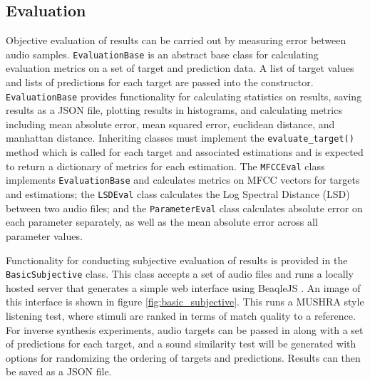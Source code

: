 \subsection{Evaluation}
Objective evaluation of results can be carried out by measuring error between audio samples. \texttt{EvaluationBase} is an abstract base class for calculating evaluation metrics on a set of target and prediction data. A list of target values and lists of predictions for each target are passed into the constructor. \texttt{EvaluationBase} provides functionality for calculating statistics on results, saving results as a JSON file, plotting results in histograms, and calculating metrics including mean absolute error, mean squared error, euclidean distance, and manhattan distance. Inheriting classes must implement the \texttt{evaluate_target()} method which is called for each target and associated estimations and is expected to return a dictionary of metrics for each estimation. The \texttt{MFCCEval} class implements \texttt{EvaluationBase} and calculates metrics on MFCC vectors for targets and estimations; the \texttt{LSDEval} class calculates the Log Spectral Distance (LSD) between two audio files; and the \texttt{ParameterEval} class calculates absolute error on each parameter separately, as well as the mean absolute error across all parameter values.

Functionality for conducting subjective evaluation of results is provided in the \texttt{BasicSubjective} class. This class accepts a set of audio files and runs a locally hosted server that generates a simple web interface using BeaqleJS \cite{kraft2014beaqlejs}. An image of this interface is shown in figure \ref{fig:basic_subjective}. This runs a MUSHRA style listening test, where stimuli are ranked in terms of match quality to a reference.  For inverse synthesis experiments, audio targets can be passed in along with a set of predictions for each target, and a sound similarity test will be generated with options for randomizing the ordering of targets and predictions. Results can then be saved as a JSON file.

